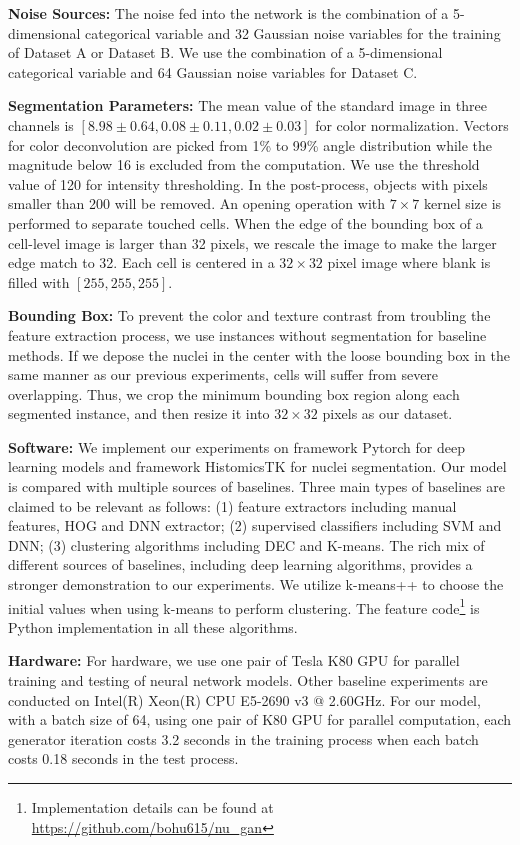 \documentclass[journal]{IEEEtran}
\begin{document}
\textbf{Noise Sources:} The noise fed into the network is the combination of a 5-dimensional categorical variable and 32 Gaussian noise variables for the training of Dataset A or Dataset B. We use the combination of a 5-dimensional categorical variable and 64 Gaussian noise variables for Dataset C.

\textbf{Segmentation Parameters:} The mean value of the standard image in three channels is $[8.98\pm 0.64, 0.08\pm 0.11, 0.02\pm 0.03]$ for color normalization. Vectors for color deconvolution are picked from 1\% to 99\% angle distribution while the magnitude below 16 is excluded from the computation. We use the threshold value of 120 for intensity thresholding. In the post-process, objects with pixels smaller than 200 will be removed. An opening operation with $7 \times 7$ kernel size is performed to separate touched cells. When the edge of the bounding box of a cell-level image is larger than 32 pixels, we rescale the image to make the larger edge match to 32. Each cell is centered in a $32 \times 32$ pixel image where blank is filled with $[255, 255, 255]$.

\textbf{Bounding Box:} To prevent the color and texture contrast from troubling the feature extraction process, we use instances without segmentation for baseline methods. If we depose the nuclei in the center with the loose bounding box in the same manner as our previous experiments, cells will suffer from severe overlapping. Thus, we crop the minimum bounding box region along each segmented instance, and then resize it into $32 \times 32$ pixels as our dataset.

\textbf{Software:} We implement our experiments on framework Pytorch for deep learning models and framework HistomicsTK for nuclei segmentation. Our model is compared with multiple sources of baselines. Three main types of baselines are claimed to be relevant as follows: (1) feature extractors including manual features, HOG and DNN extractor; (2) supervised classifiers including SVM and DNN; (3) clustering algorithms including DEC and K-means. The rich mix of different sources of baselines, including deep learning algorithms, provides a stronger demonstration to our experiments. We utilize k-means++ \cite{arthur2007k} to choose the initial values when using k-means to perform clustering. The feature code\footnote{Implementation details can be found at \url{https://github.com/bohu615/nu_gan}} is Python implementation in all these algorithms.

\textbf{Hardware:} For hardware, we use one pair of Tesla K80 GPU for parallel training and testing of neural network models. Other baseline experiments are conducted on Intel(R) Xeon(R) CPU E5-2690 v3 @ 2.60GHz. For our model, with a batch size of 64, using one pair of K80 GPU for parallel computation, each generator iteration costs 3.2 seconds in the training process when each batch costs 0.18 seconds in the test process.
\end{document}
